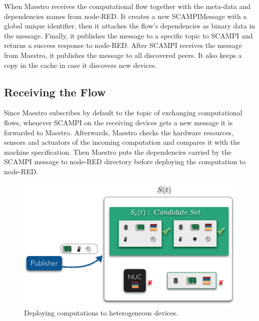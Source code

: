 \noindent When Maestro receives the computational flow  together with the meta-data and dependencies  names from node-RED. It creates a new SCAMPIMessage with  a global unique identifier, then it attaches the flow's dependencies as binary data in the message. Finally, it publishes the message to a specific topic to SCAMPI and returns a success response to node-RED. After SCAMPI receives the message from Maestro, it publishes the message to all discovered peers. It also keeps a copy in the cache in case it discovers new devices. 


\subsection{Receiving the Flow}
Since Maestro subscribes  by default  to the topic of exchanging computational flows, whenever SCAMPI on the receiving devices gets a new message it  is forwarded to Maestro. Afterwards, Maestro checks the hardware resources, sensors and actuators of the incoming computation and compares it with the machine specification. Then Maestro puts the dependencies carried by the SCAMPI message to node-RED directory before deploying the computation to node-RED.  \\




\begin{figure}[H]
	\centering
	\includegraphics[scale=0.6]{images/sets.png}
	\caption{Deploying computations to heterogeneous devices.}
	\label{fig:sets}
\end{figure}

